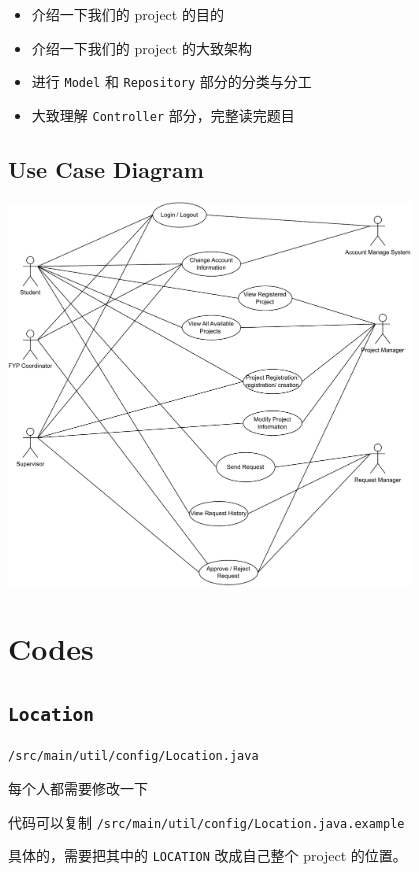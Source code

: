 \documentclass[hyperref,UTF8,12pt,a4paper]{ctexart}
\begin{document}
\begin{itemize}
	\item 介绍一下我们的 project 的目的
	\item 介绍一下我们的 project 的大致架构
	\item 进行 \texttt{Model} 和 \texttt{Repository} 部分的分类与分工
	\item 大致理解 \texttt{Controller} 部分，完整读完题目
\end{itemize}

\subsection{Use Case Diagram}

\includegraphics[width=0.8\textwidth]{diagrams/use_case_diagram.pdf}

\section{Codes}

\subsection{\texttt{Location}}

\texttt{/src/main/util/config/Location.java}

每个人都需要修改一下

代码可以复制 \texttt{/src/main/util/config/Location.java.example}

具体的，需要把其中的 \texttt{LOCATION} 改成自己整个 project 的位置。
\end{document}
